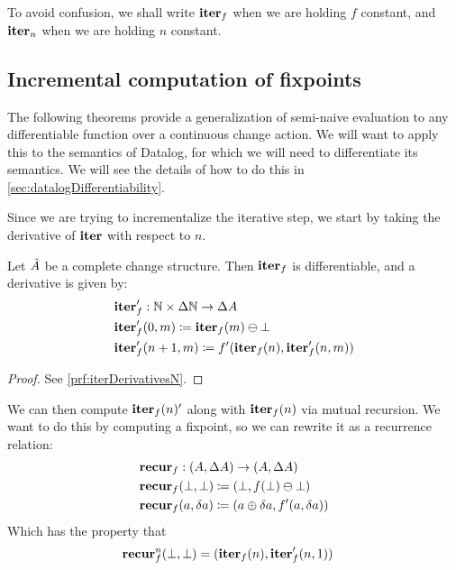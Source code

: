 To avoid confusion, we shall write $\textbf{iter}_f$ when we are holding $f$ constant,
and $\textbf{iter}_n$ when we are holding $n$ constant.

\subsection{Incremental computation of fixpoints}

The following theorems provide a
generalization of semi-naive evaluation to any differentiable function over a
continuous change action. We will want to apply this to the semantics of
Datalog, for which we will need to differentiate its semantics. We will see the
details of how to do this in \cref{sec:datalogDifferentiability}.

Since we are trying to incrementalize the iterative step, we start by taking the
derivative of $\textbf{iter}$ with respect to $n$.

\begin{prop}[name=Derivative of the iteration map with respect to $n$, restate=iterDerivativesN]
  \label{prop:iterDerivativesN}
  Let $\hat{A}$ be a complete change structure. Then $\textbf{iter}_f$ is differentiable, and a derivative is given by:
  \begin{align*}
    &\textbf{iter}_f': \mathbb{N} \times \Delta \mathbb{N} \rightarrow \Delta A\\
    &\textbf{iter}_f'(0, m) \coloneqq \textbf{iter}_f(m) \ominus \bot\\
    &\textbf{iter}_f'(n+1, m) \coloneqq f'(\textbf{iter}_f(n), \textbf{iter}_f'(n, m))
  \end{align*}
\end{prop}
\ifproofs
\begin{proof}
  See \cref{prf:iterDerivativesN}.
\end{proof}
\fi

We can then compute $\textbf{iter}_f(n)'$ along with $\textbf{iter}_f(n)$ via mutual recursion.
We want to do this by computing a fixpoint, so we can rewrite it as a recurrence
relation:
\begin{align*}
  &\textbf{recur}_f : (A, \Delta A) \rightarrow (A, \Delta A)\\
  &\textbf{recur}_f (\bot, \bot) \coloneqq (\bot, f(\bot) \ominus \bot)\\
  &\textbf{recur}_f (a, \delta a) \coloneqq (a \oplus \delta a, f'(a, \delta a))
\end{align*}
Which has the property that
\begin{align*}
  &\textbf{recur}_f^n (\bot, \bot) = (\textbf{iter}_f(n), \textbf{iter}_f'(n, 1))
\end{align*}


